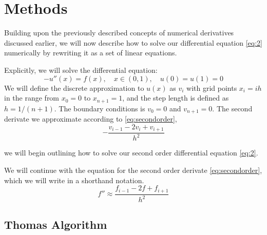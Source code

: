 \section*{Methods} 
Building upon the previously described concepts of numerical derivatives
discussed earlier, we will now describe how to solve our differential
equation \cref{eq:2}  numerically by rewriting it as a set of linear equations.
\par
Explicitly, we will solve the differential equation:
\begin{equation*}
  -u''(x) = f(x), \quad x \in (0,1), \quad u(0)=u(1)=0 
\end{equation*} 
We will define the discrete approximation to $u(x)$ as $v_i$ with grid points
$x_i = ih$ in the range from $x_0 = 0$ to $x_{n +1} = 1$, and the step length is
defined as $h = 1/(n+1)$. The boundary conditions is $v_0 = 0$ and 
$v_{n+1} = 0$. The second derivate we approximate according to
\cref{eq:secondorder},
\begin{equation}
  -\frac{v_{i-1}-2v_i + v_{i+1}}{h^2}
\end{equation} 




we will begin outlining how to solve our second order differential
equation \cref{eq:2}. \par We will continue with the equation for the
second order derivate \cref{eq:secondorder}, which we will write in a shorthand
notation. \begin{equation}
  f'' \approx \frac{f_{i-1} - 2f + f_{i+1}}{h^2}
\end{equation}

\subsection*{Thomas Algorithm}
